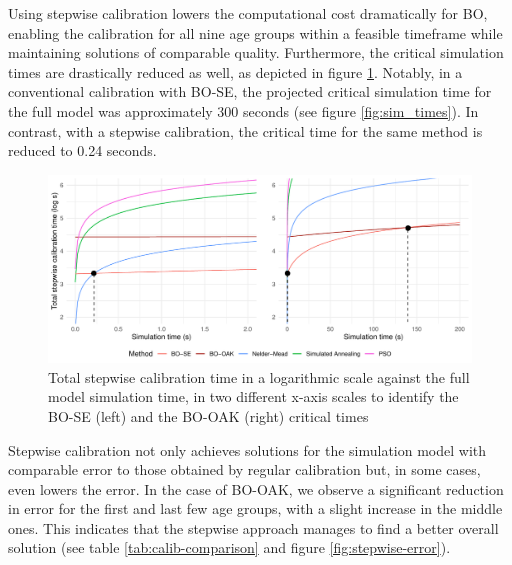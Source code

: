 \documentclass[sn-mathphys,Numbered]{sn-jnl}%
\begin{document}
Using stepwise calibration lowers the computational cost dramatically for BO, enabling the calibration for all nine age groups within a feasible timeframe while maintaining solutions of comparable quality. Furthermore, the critical simulation times are drastically reduced as well, as depicted in figure \ref{fig:crit-times-stepwise}. Notably, in a conventional calibration with BO-SE, the projected critical simulation time for the full model was approximately 300 seconds (see figure \ref{fig:sim_times}). In contrast, with a stepwise calibration, the critical time for the same method is reduced to 0.24 seconds.

\begin{figure}[h!]
	\centering	
	\includegraphics[width=\textwidth]{figs/crit_times_stepwise.pdf}		
	\caption{Total stepwise calibration time in a logarithmic scale against the full model simulation time, in two different x-axis scales to identify the BO-SE (left) and the BO-OAK (right) critical times}
	\label{fig:crit-times-stepwise}	
\end{figure}

Stepwise calibration not only achieves solutions for the simulation model with comparable error to those obtained by regular calibration but, in some cases, even lowers the error. In the case of BO-OAK, we observe a significant reduction in error for the first and last few age groups, with a slight increase in the middle ones. This indicates that the stepwise approach manages to find a better overall solution (see table \ref{tab:calib-comparison} and figure \ref{fig:stepwise-error}).
\end{document}
